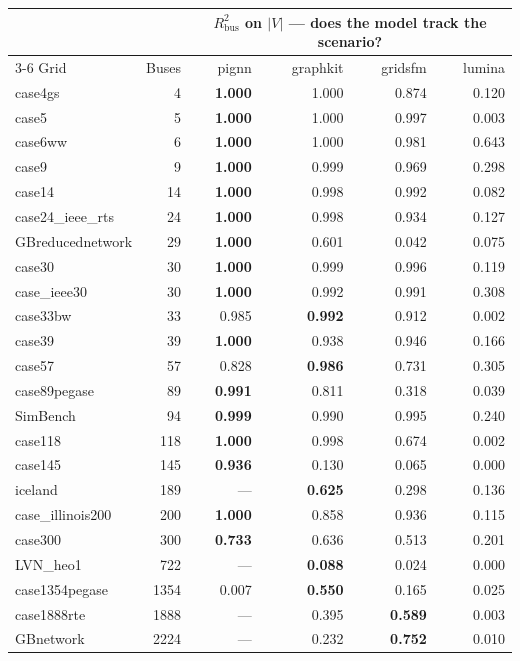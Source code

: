 \documentclass[10pt]{article}
\begin{document}
\begin{longtable}{lrrrrr}
\toprule
& & \multicolumn{4}{c}{$R^2_{\mathrm{bus}}$ on $|V|$ --- does the model track the scenario?} \\
\cmidrule(lr){3-6}
Grid & Buses & pignn & graphkit & gridsfm & lumina \\
\midrule
\endhead
case4gs & 4 & \textbf{1.000} & 1.000 & 0.874 & 0.120 \\
case5 & 5 & \textbf{1.000} & 1.000 & 0.997 & 0.003 \\
case6ww & 6 & \textbf{1.000} & 1.000 & 0.981 & 0.643 \\
case9 & 9 & \textbf{1.000} & 0.999 & 0.969 & 0.298 \\
case14 & 14 & \textbf{1.000} & 0.998 & 0.992 & 0.082 \\
case24\_ieee\_rts & 24 & \textbf{1.000} & 0.998 & 0.934 & 0.127 \\
GBreducednetwork & 29 & \textbf{1.000} & 0.601 & 0.042 & 0.075 \\
case30 & 30 & \textbf{1.000} & 0.999 & 0.996 & 0.119 \\
case\_ieee30 & 30 & \textbf{1.000} & 0.992 & 0.991 & 0.308 \\
case33bw & 33 & 0.985 & \textbf{0.992} & 0.912 & 0.002 \\
case39 & 39 & \textbf{1.000} & 0.938 & 0.946 & 0.166 \\
case57 & 57 & 0.828 & \textbf{0.986} & 0.731 & 0.305 \\
case89pegase & 89 & \textbf{0.991} & 0.811 & 0.318 & 0.039 \\
SimBench & 94 & \textbf{0.999} & 0.990 & 0.995 & 0.240 \\
case118 & 118 & \textbf{1.000} & 0.998 & 0.674 & 0.002 \\
case145 & 145 & \textbf{0.936} & 0.130 & 0.065 & 0.000 \\
iceland & 189 & --- & \textbf{0.625} & 0.298 & 0.136 \\
case\_illinois200 & 200 & \textbf{1.000} & 0.858 & 0.936 & 0.115 \\
case300 & 300 & \textbf{0.733} & 0.636 & 0.513 & 0.201 \\
LVN\_heo1 & 722 & --- & \textbf{0.088} & 0.024 & 0.000 \\
case1354pegase & 1354 & 0.007 & \textbf{0.550} & 0.165 & 0.025 \\
case1888rte & 1888 & --- & 0.395 & \textbf{0.589} & 0.003 \\
GBnetwork & 2224 & --- & 0.232 & \textbf{0.752} & 0.010 \\

\end{longtable}
\end{document}

